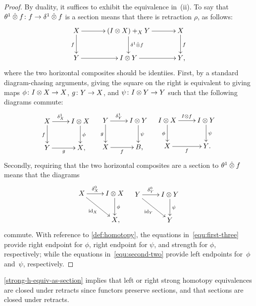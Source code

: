 \documentclass[reqno,10pt,a4paper,oneside,draft]{amsart}
\begin{document}
\begin{proof}
By duality, it suffices to exhibit the equivalence in~(ii).
To say that $\theta^{1} \mathbin{\hat{\otimes}} f \colon f \to \delta^1 \mathbin{\hat{\otimes}} f$ is a section means that there is retraction $\rho$, as follows:
\[
\xymatrix@C+1em{
  X \ar[r] \ar[d]_f & (\interval \otimes X) +_{X} Y \ar[d]^{\rcyl \hatotimes f}  \ar[r]  & X \ar[d]^f \\
  Y \ar[r] & \interval \otimes Y \ar[r] & Y \rlap{,} }
\]
where the two horizontal composites should be identiies.
First, by a standard diagram-chasing arguments, giving the square on the right is equivalent to giving maps $\phi \colon I \otimes X \to X$, $g \colon Y \to X$, and $\psi \colon I \otimes Y \to Y$ such that the following diagrams commute:
\begin{align} \label{equ:first-three}
\xycenter{
  X \ar[r]^-{\rcyl_X}  \ar[d]_f & \interval \otimes X \ar[d]^{\phi} \\
  Y \ar[r]_{g} & X \rlap{,}
}
&&
\xycenter{
  Y \ar[r]^-{\rcyl_Y} \ar[d]_g & \interval \otimes Y \ar[d]^{\psi} \\
  X \ar[r]_f & B \rlap{,}
}
&&
\xycenter{
  \interval \otimes X \ar[d]_\phi \ar[r]^{I \otimes f} & \interval \otimes Y \ar[d]^\psi \\
  X \ar[r]_{f} & Y \rlap{.}
}
\end{align}
Secondly, requiring that the two horizontal composites are a section to $\theta^{1} \mathbin{\hat{\otimes}} f$ means that the diagrams
\begin{align} \label{equ:second-two}
\xycenter{
  X \ar[r]^-{\lcyl_X} \ar[dr]_{\id_X} & \interval \otimes X \ar[d]^\phi \\
  & X \rlap{,}
}
&&
\xycenter{
  Y \ar[r]^-{\lcyl_Y}  \ar[dr]_{\id_Y} & \interval \otimes Y \ar[d]^{\psi} \\
  & Y
}
\end{align}
commute.
With reference to \cref{def:homotopy}, the equations in~\eqref{equ:first-three} provide right endpoint for $\phi$, right endpoint for $\psi$, and strength for $\phi$, respectively; while the equations in~\eqref{equ:second-two} provide left endpoints for~$\phi$ and~$\psi$, respectively.
\end{proof}

\cref{strong-h-equiv-as-section} implies that left or right strong homotopy equivalences are closed under retracts since functors preserve sections, and that sections are closed under retracts.
\end{document}
